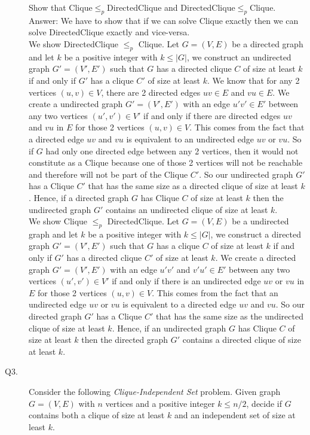 \documentclass{csc_assignment}
\begin{document}
\begin{description}
  Show that $\mathrm{Clique} \leq_p \mathrm{DirectedClique}$ and $\mathrm{DirectedClique} \leq_p \mathrm{Clique}$. \\
  Answer: We have to show that if we can solve Clique exactly then we can solve DirectedClique exactly and vice-versa. \\ We show DirectedClique $\leq_{p}$ Clique. Let $G = (V, E)$ be a directed graph and let $k$ be a positive integer with $k \leq |G|$, we construct an undirected graph $G' = (V', E')$ such that $G$ has a directed clique $C$ of size at least $k$ if and only if $G'$ has a clique $C'$ of size at least $k$. We know that for any 2 vertices $(u, v) \in V$, there are 2 directed edges $uv \in E$ and $vu \in E$. We create a undirected graph $G' = (V', E')$ with an edge $u'v' \in E'$ between any two vertices $(u', v') \in V'$ if and only if there are directed edges $uv$ and $vu$ in $E$ for those 2 vertices $(u, v) \in V$. This comes from the fact that a directed edge $uv$ and $vu$ is equivalent to an undirected edge $uv$ or $vu$. So if $G$ had only one directed edge between any 2 vertices, then it would not constitute as a Clique because one of those 2 vertices will not be reachable and therefore will not be part of the Clique  $C'$. So our undirected graph $G'$ has a Clique $C'$ that has the same size as a directed clique of size at least $k$. Hence, if a directed graph $G$ has Clique $C$ of size at least $k$ then the undirected graph $G'$ contains an undirected clique of size at least $k$. \\ We show Clique $\leq_{p}$ DirectedClique. Let $G = (V, E)$ be a undirected graph and let $k$ be a positive integer with $k \leq |G|$, we construct a directed graph $G' = (V', E')$ such that $G$ has a clique $C$ of size at least $k$ if and only if $G'$ has a directed clique $C'$ of size at least $k$. We create a directed graph $G' = (V', E')$ with an edge $u'v'$ and $v'u' \in E'$ between any two vertices $(u', v') \in V'$ if and only if there is an undirected edge $uv$ or $vu$ in $E$ for those 2 vertices $(u, v) \in V$. This comes from the fact that an undirected edge $uv$ or $vu$ is equivalent to a directed edge $uv$ and $vu$. So our directed graph $G'$ has a Clique $C'$ that has the same size as the undirected clique of size at least $k$. Hence, if an undirected graph $G$ has Clique $C$ of size at least $k$ then the directed graph $G'$ contains a directed clique of size at least $k$. 
  
\newpage
\item[Q3.]
  Consider the following \emph{Clique-Independent Set} problem.
  Given graph $G = (V, E)$ with $n$ vertices and a positive integer $k \leq n/2$, decide if $G$ contains both a clique of size at least $k$ and an independent set of size at least $k$.


\end{description}
\end{document}
